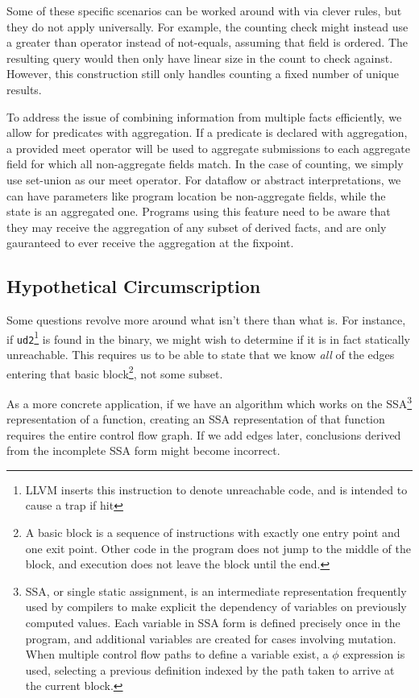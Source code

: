Some of these specific scenarios can be worked around with via clever rules, but they do not apply universally.
For example, the counting check might instead use a greater than operator instead of not-equals, assuming that field is ordered.
The resulting query would then only have linear size in the count to check against.
However, this construction still only handles counting a fixed number of unique results.

To address the issue of combining information from multiple facts efficiently, we allow for predicates with aggregation.
If a predicate is declared with aggregation, a provided meet operator will be used to aggregate submissions to each aggregate field for which all non-aggregate fields match.
In the case of counting, we simply use set-union as our meet operator.
For dataflow or abstract interpretations, we can have parameters like program location be non-aggregate fields, while the state is an aggregated one.
Programs using this feature need to be aware that they may receive the aggregation of any subset of derived facts, and are only gauranteed to ever receive the aggregation at the fixpoint.

\subsection{Hypothetical Circumscription}
Some questions revolve more around what isn't there than what is.
For instance, if \texttt{ud2}\footnote{
LLVM inserts this instruction to denote unreachable code, and is intended to cause a trap if hit
} is found in the binary, we might wish to determine if it is in fact statically unreachable.
This requires us to be able to state that we know \emph{all} of the edges entering that basic block\footnote{
A basic block is a sequence of instructions with exactly one entry point and one exit point.
Other code in the program does not jump to the middle of the block, and execution does not leave the block until the end.
}, not some subset.

As a more concrete application, if we have an algorithm which works on the SSA\footnote{
SSA, or single static assignment, is an intermediate representation frequently used by compilers to make explicit the dependency of variables on previously computed values.
Each variable in SSA form is defined precisely once in the program, and additional variables are created for cases involving mutation.
When multiple control flow paths to define a variable exist, a $\phi$ expression is used, selecting a previous definition indexed by the path taken to arrive at the current block.
} representation of a function, creating an SSA representation of that function requires the entire control flow graph.
If we add edges later, conclusions derived from the incomplete SSA form might become incorrect.

